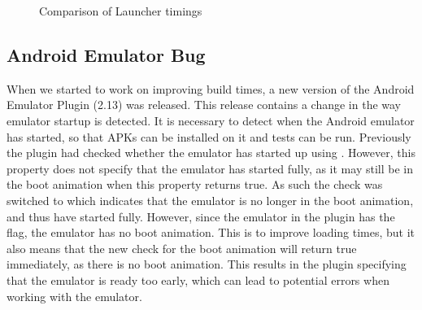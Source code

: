 \begin{figure}
\centering
{}
\caption{Comparison of Launcher timings}\label{fig:launcher_build_times_2}
\end{figure}

\subsection{Android Emulator Bug}
When we started to work on improving build times, a new version of the Android Emulator Plugin (2.13) was released. This release contains a change in the way emulator startup is detected. It is necessary to detect when the Android emulator has started, so that APKs can be installed on it and tests can be run. Previously the plugin had checked whether the emulator has started up using . However, this property does not specify that the emulator has started fully, as it may still be in the boot animation when this property returns true. As such the check was switched to   which indicates that the emulator is no longer in the boot animation, and thus have started fully. However, since the emulator in the plugin has the  flag, the emulator has no boot animation. This is to improve loading times, but it also means that the new check for the boot animation will return true immediately, as there is no boot animation. This results in the plugin specifying that the emulator is ready too early, which can lead to potential errors when working with the emulator.

